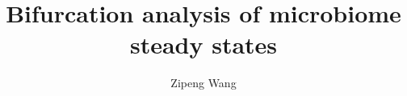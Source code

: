 \documentclass[17pt]{beamer}
\author{Zipeng Wang}
\title{Bifurcation analysis of microbiome steady states}
\begin{document}
\begin{frame}
\titlepage
\end{frame}


\begin{frame}{1}

\end{frame}
\end{document}
